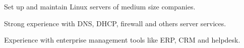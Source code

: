 \documentclass[]{willianpaixao-resume}
\begin{document}
\begin{minipage}[t]{0.64\textwidth}

\begin{tightemize}
\item Set up and maintain Linux servers of medium size companies.
\item Strong experience with DNS, DHCP, firewall and others server services.
\item Experience with enterprise management tools like ERP, CRM and helpdesk.
\end{tightemize}
\sectionsep




\end{minipage}
\end{document}
